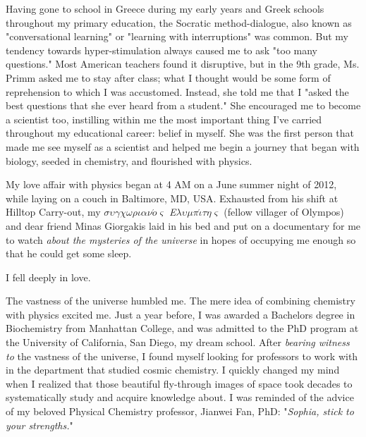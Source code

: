 \documentclass[12pt]{ucsddissertation}
\begin{document}
\begin{preface}
Having gone to school in Greece during my early years and Greek schools throughout my primary education, the Socratic method-dialogue, also known as "conversational learning" or "learning with interruptions" was common. But my tendency towards hyper-stimulation always caused me to ask "too many questions." Most American teachers found it disruptive, but in the 9th grade, Ms. Primm asked me to stay after class; what I thought would be some form of reprehension to which I was accustomed. Instead, she told me that I "asked the best questions that she ever heard from a student." She encouraged me to become a scientist too, instilling within me the most important thing I've carried throughout my educational career: belief in myself. She was the first person that made me see myself as a scientist and helped me begin a journey that began with biology, seeded in chemistry, and flourished with physics.

My love affair with physics began at 4 AM on a June summer night of 2012, while laying on a couch in Baltimore, MD, USA.  Exhausted from his shift at Hilltop Carry-out, my $\sigma\upsilon\gamma\chi\omega\rho\iota\alpha\nu\acute{o}\varsigma$ \textit{E}$\lambda\upsilon\mu\pi\acute{\iota}\tau\eta\varsigma$ (fellow villager of Olympos) and dear friend Minas Giorgakis laid in his bed and put on a documentary for me to watch \textit{about the mysteries of the universe} in hopes of occupying me enough so that he could get some sleep.  
\begin{center}
I fell deeply in love. 
\end{center}

The vastness of the universe humbled me. The mere idea of combining chemistry with physics excited me. Just a year before, I was awarded a Bachelors degree in Biochemistry from Manhattan College, and was admitted to the PhD program at the University of California, San Diego, my dream school. After \textit{bearing witness to} the vastness of the universe, I found myself looking for professors to work with in the department that studied cosmic chemistry. I quickly changed my mind when I realized that those beautiful fly-through images of space took decades to systematically study and acquire knowledge about. I was reminded of the advice of my beloved Physical Chemistry professor, Jianwei Fan, PhD: "\textit{Sophia, stick to your strengths.}"\\



\end{preface}
\end{document}
